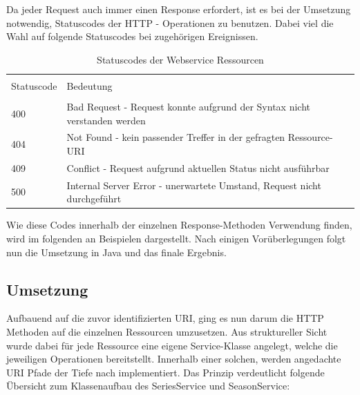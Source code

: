 \vspace{0.2cm}

Da jeder Request auch immer einen Response erfordert, ist es bei der Umsetzung notwendig, Statuscodes der HTTP - Operationen zu benutzen. Dabei viel die Wahl auf folgende Statuscodes bei zugehörigen Ereignissen.

\begin{table}[H]
\caption{Statuscodes der Webservice Ressourcen}

\centering
\begin{tabular}{l l l}
\\ [-0.5ex]

\hline\hline
\\ [-0.5ex]
Statuscode & Bedeutung
\\ [1.5ex]
\hline
\\ [-0.5ex]
400 & Bad Request - Request konnte aufgrund der Syntax nicht verstanden werden\\[1ex]
404 & Not Found - kein passender Treffer in der gefragten Ressource-URI \\[1ex]
409 & Conflict - Request aufgrund aktuellen Status nicht ausführbar\\[1ex]
500 & Internal Server Error - unerwartete Umstand, Request nicht durchgeführt\\[1ex]

\hline
\end{tabular}
\label{tab:statuscodes}
\end{table}

Wie diese Codes innerhalb der einzelnen Response-Methoden Verwendung finden, wird im folgenden an Beispielen dargestellt. Nach einigen Vorüberlegungen folgt nun die Umsetzung in Java und das finale Ergebnis.

\subsection{Umsetzung}

Aufbauend auf die zuvor identifizierten URI, ging es nun darum die HTTP Methoden auf die einzelnen Ressourcen umzusetzen. Aus struktureller Sicht wurde dabei für jede Ressource eine eigene Service-Klasse angelegt, welche die jeweiligen Operationen bereitstellt. Innerhalb einer solchen, werden angedachte URI Pfade der Tiefe nach implementiert. Das Prinzip verdeutlicht folgende Übersicht zum Klassenaufbau des SeriesService und SeasonService:

